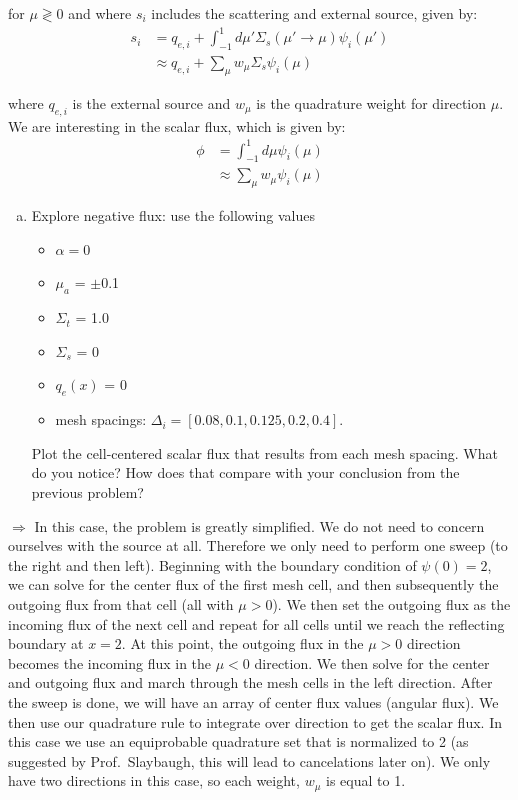 \documentclass[10pt]{article}
\begin{document}
for $\mu\gtrless0$ and where $s_i$ includes the scattering and external source, given by:
%
\begin{align*}
    s_i &= q_{e,i} + \int_{-1}^1 d\mu' \Sigma_s(\mu'\rightarrow \mu) \psi_i(\mu') \\
    &\approx q_{e,i} + \sum_\mu w_\mu \Sigma_s \psi_i(\mu)
\end{align*}

where $q_{e,i}$ is the external source and $w_\mu$ is the quadrature weight for direction $\mu$. We are interesting in the scalar flux, which is given by:
%
\begin{align*}
    \phi &= \int_{-1}^1 d\mu \psi_i(\mu) \\
    &\approx \sum_\mu w_\mu \psi_i(\mu)
\end{align*}

%
%
%

\begin{enumerate}[(a)]
\item Explore negative flux: use the following values
\begin{itemize}
\setlength\itemsep{0em}
\item $\alpha = 0$
\item $\mu_a$ = $\pm$0.1
\item $\Sigma_t$ = 1.0
\item $\Sigma_s$ = 0
\item $q_e(x)$ = 0
\item mesh spacings: $\Delta_i = [0.08, 0.1, 0.125, 0.2, 0.4]$.
\end{itemize}
Plot the cell-centered scalar flux that results from each mesh spacing. What do you notice? How does that compare with your conclusion from the previous problem?
\end{enumerate}

$\Rightarrow$ In this case, the problem is greatly simplified. We do not need to concern ourselves with the source at all. Therefore we only need to perform one sweep (to the right and then left). Beginning with the boundary condition of $\psi(0) = 2$, we can solve for the center flux of the first mesh cell, and then subsequently the outgoing flux from that cell (all with $\mu >0$). We then set the outgoing flux as the incoming flux of the next cell and repeat for all cells until we reach the reflecting boundary at $x=2$. At this point, the outgoing flux in the $\mu>0$ direction becomes the incoming flux in the $\mu<0$ direction. We then solve for the center and outgoing flux and march through the mesh cells in the left direction. After the sweep is done, we will have an array of center flux values (angular flux). We then use our quadrature rule to integrate over direction to get the scalar flux. In this case we use an equiprobable quadrature set that is normalized to 2 (as suggested by Prof.~Slaybaugh, this will lead to cancelations later on). We only have two directions in this case, so each weight, $w_\mu$ is equal to 1.\\
\end{document}
